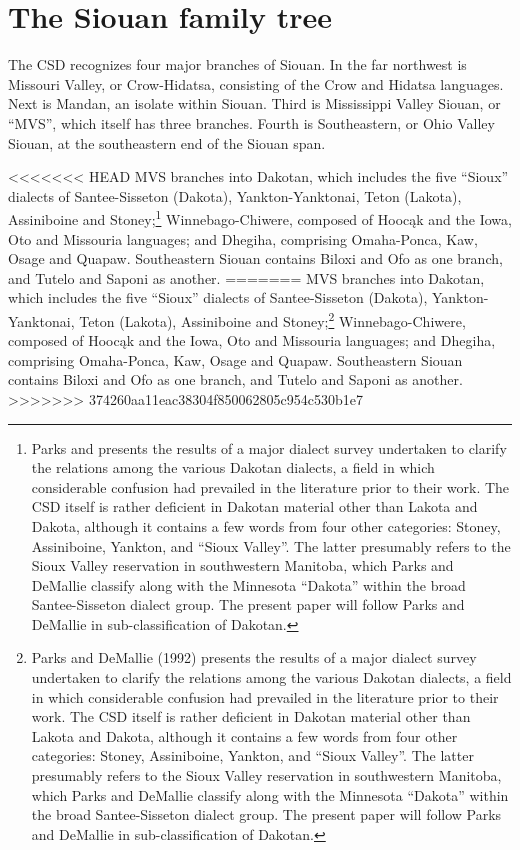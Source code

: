 \documentclass[output=paper]{LSP/langsci}
\begin{document}
\section{The Siouan family tree}

The CSD recognizes four major branches of Siouan. In the far northwest is Missouri Valley, or Crow-Hidatsa, consisting of the Crow and Hidatsa languages. Next is Mandan, an isolate within Siouan. Third is Mississippi Valley Siouan, or ``MVS'', which itself has three branches. Fourth is Southeastern, or Ohio Valley Siouan, at the southeastern end of the Siouan span.

<<<<<<< HEAD
MVS branches into Dakotan, which includes the five ``Sioux'' dialects of Santee-Sisseton (Dakota), Yankton-Yanktonai, Teton (Lakota), Assiniboine and Stoney;\footnote{Parks and \citet{DeMallie1992} presents the results of a major dialect survey undertaken to clarify the relations among the various Dakotan dialects, a field in which considerable confusion had prevailed in the literature prior to their work.  The CSD itself is rather deficient in Dakotan material other than Lakota and Dakota, although it contains a few words from four other categories: Stoney, Assiniboine, Yankton, and ``Sioux Valley''.  The latter presumably refers to the Sioux Valley reservation in southwestern Manitoba, which Parks and DeMallie classify along with the Minnesota ``Dakota'' within the broad Santee-Sisseton dialect group.  The present paper will follow Parks and DeMallie in sub-classification of Dakotan.}  Winnebago-Chiwere, composed of Hooc\k{a}k and the Iowa, Oto and Missouria languages; and Dhegiha, comprising Omaha-Ponca, Kaw, Osage and Quapaw.  Southeastern Siouan contains Biloxi and Ofo as one branch, and Tutelo and Saponi as another.
=======
MVS branches into Dakotan, which includes the five ``Sioux'' dialects of Santee-Sisseton (Dakota), Yankton-Yanktonai, Teton (Lakota), Assiniboine and Stoney;\footnote{Parks and DeMallie (1992) presents the results of a major dialect survey undertaken to clarify the relations among the various Dakotan dialects, a field in which considerable confusion had prevailed in the literature prior to their work.  The CSD itself is rather deficient in Dakotan material other than Lakota and Dakota, although it contains a few words from four other categories: Stoney, Assiniboine, Yankton, and ``Sioux Valley''.  The latter presumably refers to the Sioux Valley reservation in southwestern Manitoba, which Parks and DeMallie classify along with the Minnesota ``Dakota'' within the broad Santee-Sisseton dialect group.  The present paper will follow Parks and DeMallie in sub-classification of Dakotan.}  Winnebago-Chiwere, composed of Hooc\k{a}k and the Iowa, Oto and Missouria languages; and Dhegiha, comprising Omaha-Ponca, Kaw, Osage and Quapaw.  Southeastern Siouan contains Biloxi and Ofo as one branch, and Tutelo and Saponi as another.
>>>>>>> 374260aa11eac38304f850062805c954c530b1e7
\end{document}
